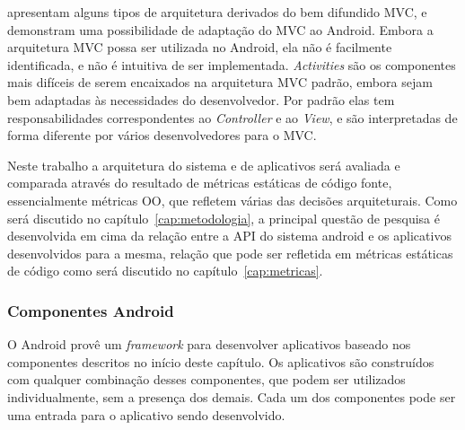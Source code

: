  apresentam alguns tipos de arquitetura derivados do bem difundido MVC, e demonstram uma possibilidade de adaptação do MVC ao Android. Embora a arquitetura MVC possa ser utilizada no Android, ela não é facilmente identificada, e não é intuitiva de ser implementada. \textit{Activities} são os componentes mais difíceis de serem encaixados na arquitetura MVC padrão, embora sejam bem adaptadas às necessidades do desenvolvedor. Por padrão elas tem responsabilidades correspondentes ao \textit{Controller} e ao \textit{View}, e são interpretadas de forma diferente por vários desenvolvedores para o MVC.

Neste trabalho a arquitetura do sistema e de aplicativos será avaliada e comparada através do resultado de métricas estáticas de código fonte, essencialmente métricas OO, que refletem várias das decisões arquiteturais. Como será discutido no capítulo~\ref{cap:metodologia}, a principal questão de pesquisa é desenvolvida em cima da relação entre a API do sistema android e os aplicativos desenvolvidos para a mesma, relação que pode ser refletida em métricas estáticas de código como será discutido no capítulo~\ref{cap:metricas}.

\subsubsection{Componentes Android} %

O Android provê um \textit{framework} para desenvolver aplicativos baseado nos componentes descritos no início deste capítulo. Os aplicativos são construídos com qualquer combinação desses componentes, que podem ser utilizados individualmente, sem a presença dos demais. Cada um dos componentes pode ser uma entrada para o aplicativo sendo desenvolvido.

